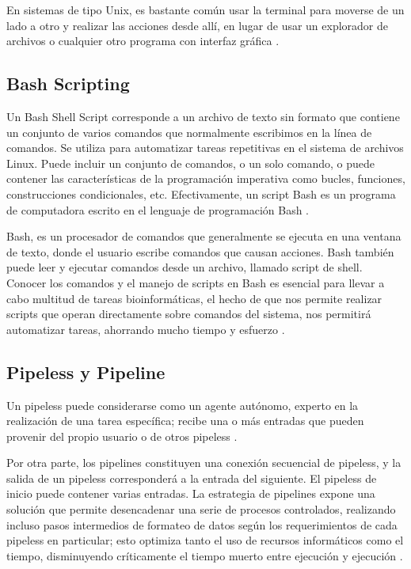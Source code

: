 \documentclass[12pt]{article}
\begin{document}
En sistemas de tipo Unix, es bastante común usar la terminal para moverse de un 
lado a otro y realizar las acciones desde allí, en lugar de usar un explorador de 
archivos o cualquier otro programa con interfaz gráfica \cite{Unix}. 

\subsection*{Bash Scripting}

Un Bash Shell Script corresponde a un archivo de texto sin formato que 
contiene un conjunto de varios comandos que normalmente escribimos en la 
línea de comandos. Se utiliza para automatizar tareas repetitivas en el 
sistema de archivos Linux. Puede incluir un conjunto de comandos, o un solo 
comando, o puede contener las características de la programación imperativa como 
bucles, funciones, construcciones condicionales, etc. Efectivamente, un script 
Bash es un programa de computadora escrito en el lenguaje de programación Bash \cite{JavatPoint}.

Bash, es un procesador de comandos que generalmente se ejecuta en una ventana de 
texto, donde el usuario escribe comandos que causan acciones. Bash también puede 
leer y ejecutar comandos desde un archivo, llamado script de shell.  Conocer los 
comandos y el manejo de scripts en Bash es esencial para llevar a cabo multitud de 
tareas bioinformáticas, el hecho de que nos permite realizar scripts que operan 
directamente sobre comandos del sistema, nos permitirá automatizar tareas, ahorrando 
mucho tiempo y esfuerzo \cite{Bash}.

\subsection*{Pipeless y Pipeline}

Un pipeless puede considerarse como un agente autónomo, experto en la 
realización de una tarea específica; recibe una o más entradas que pueden 
provenir del propio usuario o de otros pipeless \cite{Hadad}.

Por otra parte, los pipelines constituyen una conexión secuencial de 
pipeless, y  la salida de un pipeless corresponderá a la entrada del siguiente. 
El pipeless de inicio puede contener varias entradas. La estrategia de pipelines 
expone una solución que permite desencadenar una serie de procesos controlados, 
realizando incluso pasos intermedios de formateo de datos según los requerimientos 
de cada pipeless en particular; esto optimiza tanto el uso de recursos informáticos 
como el tiempo, disminuyendo críticamente el tiempo muerto entre 
ejecución y ejecución \cite{Hadad}.
\end{document}
